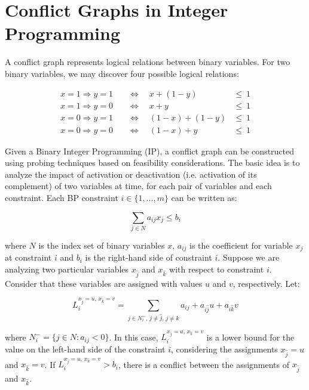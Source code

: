 \documentclass{endm}
\begin{document}
\section{Conflict Graphs in Integer Programming}\label{graph}

A conflict graph represents logical relations between binary variables. For two binary variables, we may discover four possible logical relations:

\begin{align}
x = 1 \Rightarrow y = 1 & \quad \Longleftrightarrow \quad x + (1 - y) & \leq \ 1\\
x = 1 \Rightarrow y = 0 & \quad \Longleftrightarrow \quad x + y & \leq \ 1 \\
x = 0 \Rightarrow y = 1 & \quad \Longleftrightarrow \quad (1 - x) + (1 - y) & \leq \ 1 \\
x = 0 \Rightarrow y = 0 & \quad \Longleftrightarrow \quad (1 - x) + y & \leq \ 1
\end{align}

Given a Binary Integer Programming (IP), a conflict graph can be constructed using probing techniques based on feasibility considerations. The basic idea is to analyze the impact of activation or deactivation (i.e. activation of its complement) of two variables at time, for each pair of variables and each constraint. Each BP constraint $i \in \{1,\ldots,m\}$ can be written as:

\begin{equation}
 \sum_{j \in N} a_{ij}x_{j} \leq b_{i} 
\end{equation}

\noindent where $N$ is the index set of binary variables $x$, $a_{ij}$ is the coefficient for variable $x_{j}$ at constraint $i$ and $b_{i}$ is the right-hand side of constraint $i$. Suppose we are analyzing two particular variables $x_{\hat{j}}$ and $x_{\hat{k}}$ with respect to constraint $i$. Consider that these variables are assigned with values $u$ and $v$, respectively. Let:

\begin{equation}\label{li}
L_{i}^{x_{\hat{j}} = u,\, x_{\hat{k}} = v}=\sum_{j\in N_{i}^{-},\, j\neq\hat{j},\, j\neq\hat{k}}a_{ij}+a_{i\hat{j}}u+a_{i\hat{k}}v 
\end{equation}

\noindent where $N_{i}^{-} = \{j \in N : a_{ij} < 0\}$. In this case, $L_{i}^{x_{\hat{j}} = u,\, x_{\hat{k}} = v}$ is a lower bound for the value on the left-hand side  of the constraint $i$, considering the assignments $x_{\hat{j}} = u$ and $x_{\hat{k}} = v$. If $L_{i}^{x_{\hat{j}} = u,\, x_{\hat{k}} = v} > b_{i}$, there is a conflict between the assignments of $x_{\hat{j}}$ and $x_{\hat{k}}$. 
\end{document}
